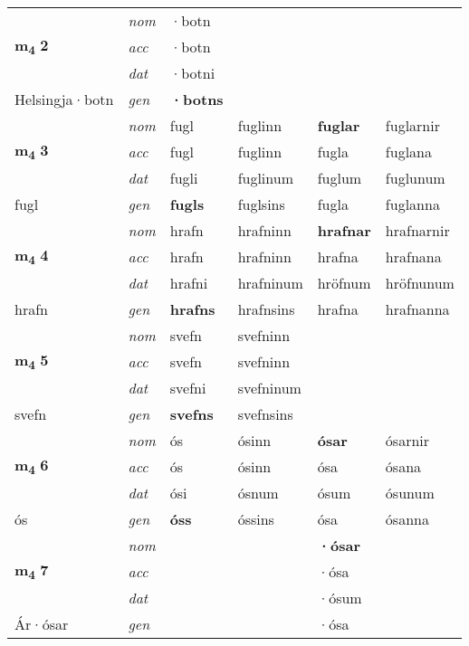 \begin{longtable}[l]{X>{\footnotesize\itshape}XXXXX}
\multirow{3}{*}{{{\textbf{m{\textsubscript{4}}} \Large{\textbf{2}}}}} & nom & ·botn &  & \textbf{} &  \\*
 & acc & ·botn &  &  &  \\*
 & dat & ·botni &  &  &  \\*
 {\footnotesize{Helsingja\allowbreak ·botn}} & gen & \textbf{·botns} &  &  &  \\
\midrule

\multirow{3}{*}{{{\textbf{m{\textsubscript{4}}} \Large{\textbf{3}}}}} & nom & fugl & fuglinn & \textbf{fuglar} & fuglarnir \\*
 & acc & fugl & fuglinn & fugla & fuglana \\*
 & dat & fugli & fuglinum & fuglum & fuglunum \\*
 {\footnotesize{fugl}} & gen & \textbf{fugls} & fuglsins & fugla & fuglanna \\
\midrule

\multirow{3}{*}{{{\textbf{m{\textsubscript{4}}} \Large{\textbf{4}}}}} & nom & hrafn & hrafninn & \textbf{hrafnar} & hrafnarnir \\*
 & acc & hrafn & hrafninn & hrafna & hrafnana \\*
 & dat & hrafni & hrafninum & hröfnum & hröfnunum \\*
 {\footnotesize{hrafn}} & gen & \textbf{hrafns} & hrafnsins & hrafna & hrafnanna \\
\midrule

\multirow{3}{*}{{{\textbf{m{\textsubscript{4}}} \Large{\textbf{5}}}}} & nom & svefn & svefninn & \textbf{} &  \\*
 & acc & svefn & svefninn &  &  \\*
 & dat & svefni & svefninum &  &  \\*
 {\footnotesize{svefn}} & gen & \textbf{svefns} & svefnsins &  &  \\
\midrule

\multirow{3}{*}{{{\textbf{m{\textsubscript{4}}} \Large{\textbf{6}}}}} & nom & ós & ósinn & \textbf{ósar} & ósarnir \\*
 & acc & ós & ósinn & ósa & ósana \\*
 & dat & ósi & ósnum & ósum & ósunum \\*
 {\footnotesize{ós}} & gen & \textbf{óss} & óssins & ósa & ósanna \\
\midrule

\multirow{3}{*}{{{\textbf{m{\textsubscript{4}}} \Large{\textbf{7}}}}} & nom &  &  & \textbf{·ósar} &  \\*
 & acc &  &  & ·ósa &  \\*
 & dat &  &  & ·ósum &  \\*
 {\footnotesize{Ár\allowbreak ·ósar}} & gen & \textbf{} &  & ·ósa &  \\
\midrule


\end{longtable}
